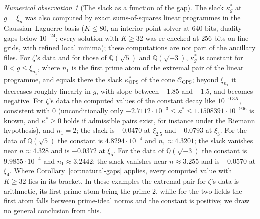 \documentclass[11pt]{amsart}
\newcommand{\QQ}{\mathbb Q}
\newcommand{\xin}[1]{\xi_{#1}}
\newcommand{\ConeOPS}{\mathcal C_{\mathrm{OPS}}}
\newcommand{\kstar}{\kappa^{*}}
\newcommand{\kOPS}{\kappa^{*}_{\mathrm{OPS}}}
\theoremstyle{definition}
\theoremstyle{remark}
\newtheorem{observation}[theorem]{Numerical observation}
\numberwithin{equation}{section}
\begin{document}
\begin{observation}[The slack as a function of the gap]\label{obs:gap-profile}
The slack $\kstar_g$ at $g=\xin n$ was also computed by exact sums-of-squares linear programmes in the Gaussian--Laguerre basis
($K\le80$, an interior-point solver at $640$ bits, duality gaps below $10^{-24}$; every solution with $K\ge32$ was re-checked at
$256$ bits on fine grids, with refined local minima); these computations are not part of the ancillary files. For $\zeta$'s data
and for those of $\QQ(\sqrt5)$ and $\QQ(\sqrt{-3})$, $\kstar_g$ is constant for $0<g\le\xin{n_1}$, where $n_1$ is the first prime atom
of the extremal pair of the linear programme, and equals there the slack $\kOPS$ of the cone $\ConeOPS$; beyond $\xin{n_1}$ it
decreases roughly linearly in $g$, with slope between $-1.85$ and $-1.5$, and becomes negative. For $\zeta$'s data the computed values of the
constant decay like $10^{-0.3K}$, consistent with $0$ (unconditionally only $-2.7112\cdot10^{-3}\le\kstar\le1.1508391\cdot10^{-906}$ is
known, and $\kstar\ge0$ holds if admissible pairs exist, for instance under the Riemann hypothesis), and $n_1=2$; the slack is $-0.0470$ at $\xin{2.5}$ and $-0.0793$ at $\xin3$. For the
data of $\QQ(\sqrt5)$ the constant is $4.8294\cdot10^{-4}$ and $n_1\approx4.3201$; the slack vanishes near $n\approx4.328$ and is
$-0.0372$ at $\xin5$. For the data of $\QQ(\sqrt{-3})$ the constant is $9.9855\cdot10^{-4}$ and $n_1\approx3.2442$; the slack vanishes
near $n\approx3.255$ and is $-0.0570$ at $\xin4$. Where Corollary~\ref{cor:natural-gaps} applies, every computed value with $K\ge32$ lies
in its bracket. In these examples the extremal pair for $\zeta$'s data is arithmetic, its first prime atom being the prime $2$, while for
the two fields the first atom falls between prime-ideal norms and the constant is positive; we draw no general conclusion from this.
\end{observation}
\end{document}
